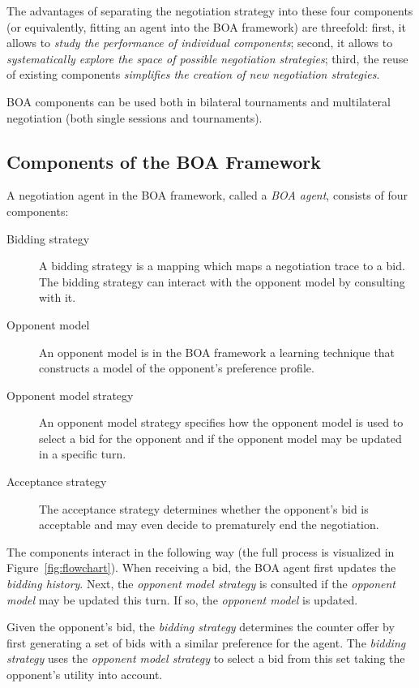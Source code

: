 \documentclass[]{article}
\begin{document}
The advantages of separating the negotiation strategy into these four components (or equivalently, fitting an agent into the BOA framework) are threefold: first, it allows to \textit{study the performance of individual components}; second, it allows to \textit{systematically explore the space of possible negotiation strategies}; third, the reuse of existing components \textit{simplifies the creation of new negotiation strategies}.

BOA components can be used both in bilateral tournaments and multilateral negotiation (both single sessions and tournaments). 



\subsection{Components of the BOA Framework}
A negotiation agent in the BOA framework, called a \textit{BOA agent}, consists of four components:
\begin{description}
  \item[Bidding strategy] A bidding strategy is a mapping which maps a negotiation trace to a bid. The bidding strategy can interact with the opponent model by consulting with it.%

  \item[Opponent model] An opponent model is in the BOA framework a learning technique that constructs a model of the opponent's preference profile.%
  \item[Opponent model strategy] An opponent model strategy specifies how the opponent model is used to select a bid for the opponent and if the opponent model may be updated in a specific turn.
  \item[Acceptance strategy] The acceptance strategy determines whether the opponent's bid is acceptable and may even decide to prematurely end the negotiation.
\end{description}
The components interact in the following way (the full process is visualized in Figure~\ref{fig:flowchart}). When receiving a bid, the BOA agent first  updates the \textit{bidding history}. Next, the \textit{opponent model strategy} is consulted if the \textit{opponent model} may be updated this turn. If so, the \textit{opponent model} is updated.

Given the opponent's bid, the \textit{bidding strategy} determines the counter offer by first generating a set of bids with a similar preference for the agent. The \textit{bidding strategy} uses the \textit{opponent model strategy} to select a bid from this set taking the opponent's utility into account.
\end{document}
